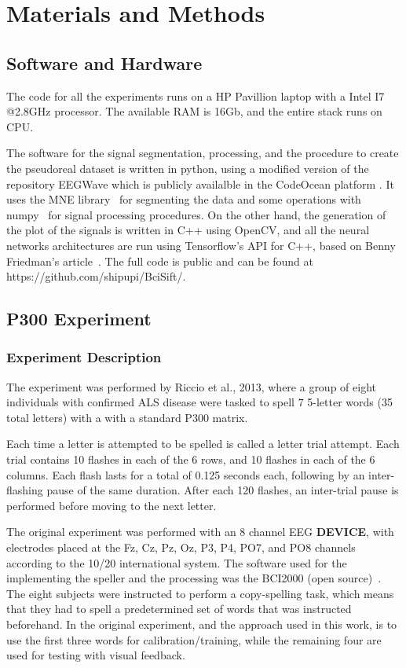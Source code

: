 \documentclass[conference]{IEEEtran}
\begin{document}
\section{Materials and Methods}


\subsection{Software and Hardware}
The code for all the experiments runs on a HP Pavillion laptop with a Intel I7 @2.8GHz processor. The available RAM is 16Gb, and the entire stack runs on CPU.

The software for the signal segmentation, processing, and the procedure to create the pseudoreal dataset is written in python, using a modified version of the repository EEGWave which is publicly availalble in the CodeOcean platform \cite{Ramele2018EEGWA}. It uses the MNE library~\cite{Gramfort.etal2014} for segmenting the data and some operations with numpy~\cite{Harris.etal2020} for signal processing procedures.
On the other hand, the generation of the plot of the signals is written in C++ using OpenCV, and all the neural networks architectures  are run using Tensorflow's API for C++, based on Benny Friedman's article~\cite{BennyCNN}. The full code is public and can be found at https://github.com/shipupi/BciSift/.


\subsection{P300 Experiment}
\subsubsection{Experiment Description}
The experiment was performed by Riccio et al., 2013\cite{riccio2013}, where a group of eight individuals with confirmed ALS disease were tasked to spell $7$ 5-letter words (35 total letters) with a with a standard P300 matrix.  

Each time a letter is attempted to be spelled is called a letter trial attempt. Each trial contains 10 flashes in each of the 6 rows, and 10 flashes in each of the 6 columns. Each flash lasts for a total of 0.125 seconds each, following by an inter-flashing pause of the same duration. After each 120 flashes, an inter-trial pause is performed before moving to the next letter.

The original experiment was performed with an 8 channel EEG \textbf{DEVICE}, with electrodes placed at the Fz, Cz, Pz, Oz, P3, P4, PO7, and PO8 channels according to the 10/20 international system. The software used for the implementing the speller and the processing was the BCI2000 (open source)~\cite{schalk2004}. The eight subjects were instructed to perform a copy-spelling task, which means that they had to spell a predetermined set of words that was instructed beforehand.  In the original experiment, and the approach used in this work, is to use the first three words for calibration/training, while the remaining four are used for testing with visual feedback.
\end{document}
